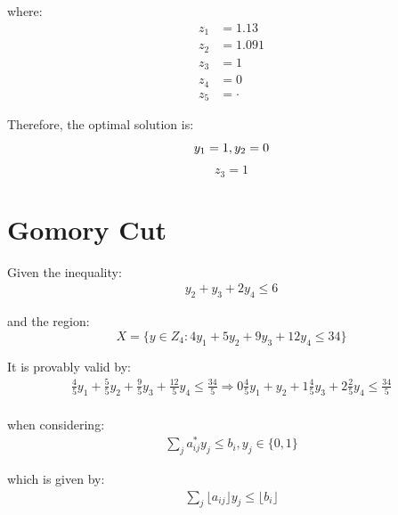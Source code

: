 \documentclass{article}
\begin{document}
where: 
\begin{equation}
\begin{split}
    z_1 & = 1.13\\
    z_2 & = 1.091\\
    z_3 & = 1\\
    z_4 & = 0\\
    z_5 & = \cdot 
\end{split}
\end{equation}

Therefore, the optimal solution is:
\begin{equation}
    y_1 = 1, y_2 = 0\\
\end{equation}
\begin{equation}\nonumber
    z_3 = 1
\end{equation}


\section*{Gomory Cut}
Given the inequality: 
\begin{equation}
\begin{split}
    y_2 + y_3 + 2y_4 \leq 6
\end{split}
\end{equation}

and the region:
\begin{equation}
    X = \{y \in Z_4: 4y_1 + 5y_2 + 9y_3 + 12y_4 \leq 34 \}
\end{equation}

It is provably valid by:
\begin{equation}
\begin{split}
    \frac{4}{5} y_1 + \frac{5}{5}y_2 + \frac{9}{5}y_3 + \frac{12}{5}y_4 \leq \frac{34}{5} \Longrightarrow 0\frac{4}{5} y_1 + y_2 + 1\frac{4}{5}y_3 + 2\frac{2}{5}y_4 \leq \frac{34}{5}\\
\end{split}
\end{equation}

when considering:
\begin{equation}
\begin{split}
    \sum_{j} a_{ij}^{*}y_j \leq b_i, y_j \in \{0, 1\}
\end{split}
\end{equation}

which is given by:
\begin{equation}
\begin{split}
    \sum_{j} \lfloor{a_{ij}}\rfloor y_j \leq \lfloor{b_i}\rfloor
\end{split}
\end{equation}
\end{document}
